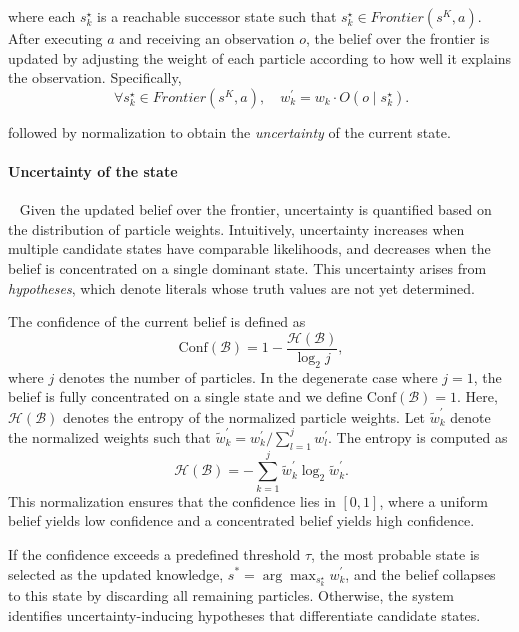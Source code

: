 where each $s_k^{\star}$ is a reachable successor state such that $s_k^{\star} \in Frontier(s^{K}, a)$.
After executing $a$ and receiving an observation $o$, the belief over the frontier is updated by adjusting the weight of each particle according to how well it explains the observation. Specifically, 
\begin{equation}~\label{eq:belief_update}
\forall s_k^{\star} \in Frontier(s^{K}, a), \quad
w_k^\prime = w_k \cdot O(o \mid s_k^{\star}).\end{equation}

followed by normalization to obtain the \textit{uncertainty} of the current state.


\paragraph{Uncertainty of the state}~\label{method:uncertainty}
Given the updated belief over the frontier, uncertainty is quantified based on the distribution of particle weights. Intuitively, uncertainty increases when multiple candidate states have comparable likelihoods, and decreases when the belief is concentrated on a single dominant state. This uncertainty arises from \textit{hypotheses}, which denote literals whose truth values are not yet determined.

The confidence of the current belief is defined as
\begin{equation}~\label{eq:compute_confidence}
\mathrm{Conf}(\mathcal{B}) = 1 - \frac{\mathcal{H}(\mathcal{B})}{\log_2 j},
\end{equation}
where $j$ denotes the number of particles. In the degenerate case where $j=1$, the belief is fully concentrated on a single state and we define $\mathrm{Conf}(\mathcal{B}) = 1$. Here, $\mathcal{H}(\mathcal{B})$ denotes the entropy of the normalized particle weights. Let $\tilde{w}_k^\prime$ denote the normalized weights such that $\tilde{w}_k^\prime = {w_k^\prime}/{\sum_{l=1}^{j} w_l^\prime}$. The entropy is computed as
\begin{equation}~\label{eq:compute_entropy}
\mathcal{H}(\mathcal{B}) = - \sum_{k=1}^{j} \tilde{w}_k^\prime \log_2 \tilde{w}_k^\prime.
\end{equation}
This normalization ensures that the confidence lies in $[0,1]$, where a uniform belief yields low confidence and a concentrated belief yields high confidence.

If the confidence exceeds a predefined threshold $\tau$, the most probable state is selected as the updated knowledge, $s^{*} = \arg\max_{s_k^{\star}} w_k^\prime$, and the belief collapses to this state by discarding all remaining particles. Otherwise, the system identifies uncertainty-inducing hypotheses that differentiate candidate states.

